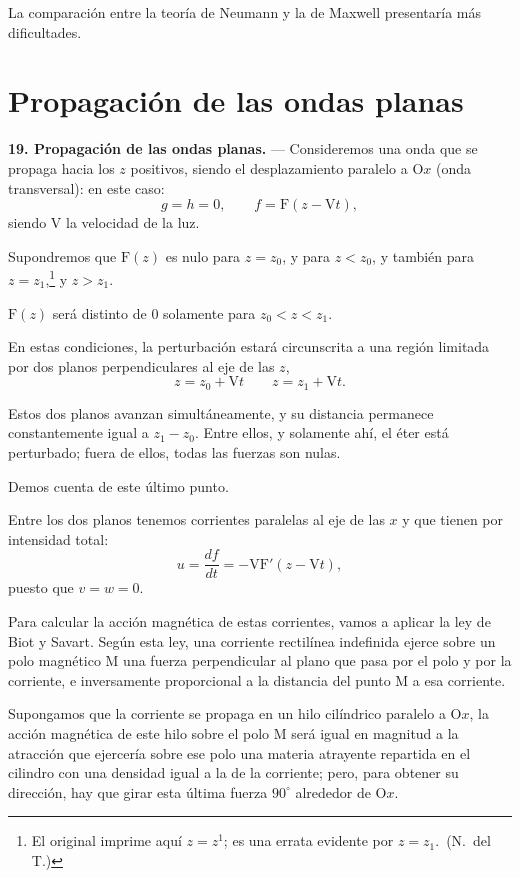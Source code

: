 La comparación entre la teoría de Neumann y la de Maxwell presentaría más
dificultades.

\section{Propagación de las ondas planas}

\noindent\textbf{19. Propagación de las ondas planas.} — Consideremos una
onda que se propaga hacia los $z$ positivos, siendo el desplazamiento
paralelo a $\mathrm{O}x$ (onda transversal): en este caso:
\[
g=h=0,\qquad f=\mathrm{F}(z-\mathrm{V}t),
\]
siendo $\mathrm{V}$ la velocidad de la luz.

Supondremos que $\mathrm{F}(z)$ es nulo para $z=z_0$, y para $z<z_0$, y
también para $z=z_1$,\footnote{El original imprime aquí $z=z^1$; es una
errata evidente por $z=z_1$.~(N.~del T.)} y $z>z_1$.

$\mathrm{F}(z)$ será distinto de $0$ solamente para $z_0<z<z_1$.

En estas condiciones, la perturbación estará circunscrita a una región
limitada por dos planos perpendiculares al eje de las $z$,
\[
z=z_0+\mathrm{V}t\qquad z=z_1+\mathrm{V}t.
\]

Estos dos planos avanzan simultáneamente, y su distancia permanece
constantemente igual a $z_1-z_0$. Entre ellos, y solamente ahí, el éter
está perturbado; fuera de ellos, todas las fuerzas son nulas.

Demos cuenta de este último punto.

Entre los dos planos tenemos corrientes paralelas al eje de las $x$ y que
tienen por intensidad total:
\[
u=\frac{df}{dt}=-\mathrm{V}\mathrm{F}'(z-\mathrm{V}t),
\]
puesto que $v=w=0$.

Para calcular la acción magnética de estas corrientes, vamos a aplicar la
ley de Biot y Savart. Según esta ley, una corriente rectilínea indefinida
ejerce sobre un polo magnético $\mathrm{M}$ una fuerza perpendicular al
plano que pasa por el polo y por la corriente, e inversamente proporcional
a la distancia del punto $\mathrm{M}$ a esa corriente.

Supongamos que la corriente se propaga en un hilo cilíndrico paralelo a
$\mathrm{O}x$, la acción magnética de este hilo sobre el polo $\mathrm{M}$
será igual en magnitud a la atracción que ejercería sobre ese polo una
materia atrayente repartida en el cilindro con una densidad igual a la de
la corriente; pero, para obtener su dirección, hay que girar esta última
fuerza $90^{\circ}$ alrededor de $\mathrm{O}x$.

